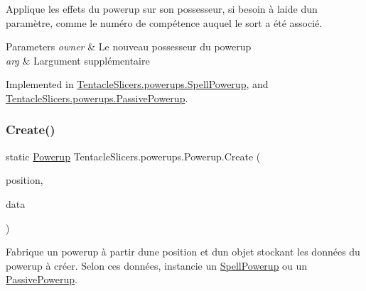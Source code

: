Applique les effets du powerup sur son possesseur, si besoin à l\textquotesingle{}aide d\textquotesingle{}un paramètre, comme le numéro de compétence auquel le sort a été associé. 


\begin{DoxyParams}{Parameters}
{\em owner} & Le nouveau possesseur du powerup \\
\hline
{\em arg} & L\textquotesingle{}argument supplémentaire \\
\hline
\end{DoxyParams}


Implemented in \hyperlink{class_tentacle_slicers_1_1powerups_1_1_spell_powerup_a33b18ec95beafbdf151908c1aca562f9}{Tentacle\+Slicers.\+powerups.\+Spell\+Powerup}, and \hyperlink{class_tentacle_slicers_1_1powerups_1_1_passive_powerup_a362a58a946f2d33b4aeef20ce605c8f9}{Tentacle\+Slicers.\+powerups.\+Passive\+Powerup}.

\mbox{\label{class_tentacle_slicers_1_1powerups_1_1_powerup_a9aecde45bf218c2241b7454235e68050}} 
\subsubsection{\texorpdfstring{Create()}{Create()}}
{\footnotesize\ttfamily static \hyperlink{class_tentacle_slicers_1_1powerups_1_1_powerup}{Powerup} Tentacle\+Slicers.\+powerups.\+Powerup.\+Create (\begin{DoxyParamCaption}\item[{Point}]{position,  }\item[{\hyperlink{class_tentacle_slicers_1_1powerups_1_1_powerup_data}{Powerup\+Data}}]{data }\end{DoxyParamCaption})\hspace{0.3cm}{\ttfamily [static]}}



Fabrique un powerup à partir d\textquotesingle{}une position et d\textquotesingle{}un objet stockant les données du powerup à créer. Selon ces données, instancie un \hyperlink{class_tentacle_slicers_1_1powerups_1_1_spell_powerup}{Spell\+Powerup} ou un \hyperlink{class_tentacle_slicers_1_1powerups_1_1_passive_powerup}{Passive\+Powerup}. 


